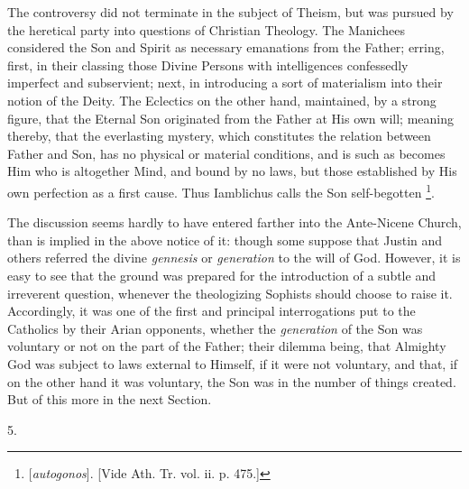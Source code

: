 The controversy did not terminate in the subject of Theism, but was
pursued by the heretical party into questions of Christian Theology.
The Manichees considered the Son and Spirit as necessary emanations
from the Father; erring, first, in their classing those Divine Persons
with intelligences confessedly imperfect and subservient; next, in
introducing a sort of materialism into their notion of the Deity. The
Eclectics on the other hand, maintained, by a strong figure, that the
Eternal Son originated from the Father at His own will; meaning
thereby, that the everlasting mystery, which constitutes the relation
between Father and Son, has no physical or material conditions, and is
such as becomes Him who is altogether Mind, and bound by no
laws, but those established by His own perfection as a first cause.
Thus Iamblichus calls the Son self-begotten \footnote{[\emph{autogonos}]. [Vide Ath. Tr. vol.
ii. p. 475.]}.

The discussion seems hardly to have entered farther into the
Ante-Nicene Church, than is implied in the above notice of it: though
some suppose that Justin and others referred the divine \emph{gennesis}
or \emph{generation} to the will of God. However, it is easy to see
that the ground was prepared for the introduction of a subtle and
irreverent question, whenever the theologizing Sophists should choose
to raise it. Accordingly, it was one of the first and principal
interrogations put to the Catholics by their Arian opponents, whether
the \emph{generation} of the Son was voluntary or not on the part of
the Father; their dilemma being, that Almighty God was subject to laws
external to Himself, if it were not voluntary, and that, if on the
other hand it was voluntary, the Son was in the number of things
created. But of this more in the next Section.

5.

